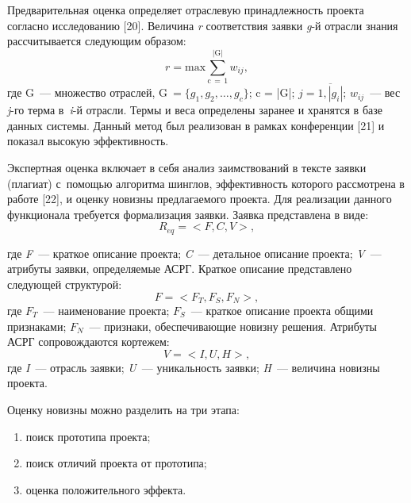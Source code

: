 Предварительная оценка определяет отраслевую принадлежность проекта согласно исследованию [20]. Величина \textit{r} соответствия заявки \textit{g}-й отрасли знания рассчитывается следующим образом:
\begin{equation}
  r = \text{max}\sum_{\text{c}\,=\,1}^{|\text{G}|}{w_{ij}},
\end{equation}
где G~--- множество отраслей, $\text{G}~= \{g_1, g_2,\dots, g_c \}$; c = |G|; $j=\overline{1,|g_i|}$; $w_{ij}$~--- вес \textit{j}-го терма в~\textit{i}-й отрасли. Термы и веса определены заранее и хранятся в базе данных системы. Данный метод был реализован в рамках конференции [21] и показал высокую эффективность.

Экспертная оценка включает в себя анализ заимствований в тексте заявки (плагиат) с~помощью алгоритма шинглов, эффективность которого рассмотрена в работе [22], и оценку новизны предлагаемого проекта. Для реализации данного функционала требуется формализация заявки. Заявка представлена в виде:
\begin{equation}
  R_{eq}= < F, C, V >,
\end{equation}
\enlargethispage{\baselineskip}





\hspace{-0.5cm}где \textit{F}~--- краткое описание проекта; \textit{C}~--- детальное описание проекта; \textit{V}~--- атрибуты заявки, определяемые АСРГ. Краткое описание представлено следующей структурой:
\begin{equation}
  F = < F_T, F_S, F_N >,
\end{equation}
где $F_T$~--- наименование проекта; $F_S$~--- краткое описание проекта общими признаками; $F_N$~--- признаки, обеспечивающие новизну решения. Атрибуты АСРГ сопровождаются кортежем:
\begin{equation}
  V = < I, U, H >,
\end{equation}
где \textit{I}~--- отрасль заявки; \textit{U}~--- уникальность заявки; \textit{H}~--- величина новизны проекта.

Оценку новизны можно разделить на три этапа:
\begin{enumerate}[noitemsep]\vspace{-8pt}
    \item поиск прототипа проекта;
    \item поиск отличий проекта от прототипа;
    \item оценка положительного эффекта.
\end{enumerate}\vspace{-8pt}

